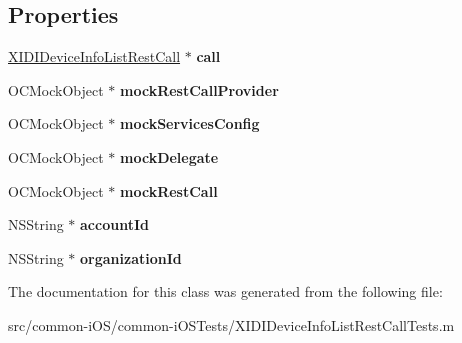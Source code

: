 \subsection*{Properties}
\begin{DoxyCompactItemize}
\item 
\hypertarget{interface_x_i_d_i_device_info_list_rest_call_tests_a65da98e4e776555e3537ef40987752d7}{}\label{interface_x_i_d_i_device_info_list_rest_call_tests_a65da98e4e776555e3537ef40987752d7} 
\hyperlink{interface_x_i_d_i_device_info_list_rest_call}{X\+I\+D\+I\+Device\+Info\+List\+Rest\+Call} $\ast$ {\bfseries call}
\item 
\hypertarget{interface_x_i_d_i_device_info_list_rest_call_tests_aac1fa51a02d67b953418c69668ecedd9}{}\label{interface_x_i_d_i_device_info_list_rest_call_tests_aac1fa51a02d67b953418c69668ecedd9} 
O\+C\+Mock\+Object $\ast$ {\bfseries mock\+Rest\+Call\+Provider}
\item 
\hypertarget{interface_x_i_d_i_device_info_list_rest_call_tests_ab87c63f846e7723bfe381d8e3baa18e5}{}\label{interface_x_i_d_i_device_info_list_rest_call_tests_ab87c63f846e7723bfe381d8e3baa18e5} 
O\+C\+Mock\+Object $\ast$ {\bfseries mock\+Services\+Config}
\item 
\hypertarget{interface_x_i_d_i_device_info_list_rest_call_tests_a8feacf9b57db974e4cc7c09fe9dc0804}{}\label{interface_x_i_d_i_device_info_list_rest_call_tests_a8feacf9b57db974e4cc7c09fe9dc0804} 
O\+C\+Mock\+Object $\ast$ {\bfseries mock\+Delegate}
\item 
\hypertarget{interface_x_i_d_i_device_info_list_rest_call_tests_a12026d0029ecd8f513db1891dc78fd14}{}\label{interface_x_i_d_i_device_info_list_rest_call_tests_a12026d0029ecd8f513db1891dc78fd14} 
O\+C\+Mock\+Object $\ast$ {\bfseries mock\+Rest\+Call}
\item 
\hypertarget{interface_x_i_d_i_device_info_list_rest_call_tests_a0ee6dff09e92d80b6f5b31addc49351f}{}\label{interface_x_i_d_i_device_info_list_rest_call_tests_a0ee6dff09e92d80b6f5b31addc49351f} 
N\+S\+String $\ast$ {\bfseries account\+Id}
\item 
\hypertarget{interface_x_i_d_i_device_info_list_rest_call_tests_a3a1d46d39a0c92397b57227612d2626b}{}\label{interface_x_i_d_i_device_info_list_rest_call_tests_a3a1d46d39a0c92397b57227612d2626b} 
N\+S\+String $\ast$ {\bfseries organization\+Id}
\end{DoxyCompactItemize}


The documentation for this class was generated from the following file\+:\begin{DoxyCompactItemize}
\item 
src/common-\/i\+O\+S/common-\/i\+O\+S\+Tests/X\+I\+D\+I\+Device\+Info\+List\+Rest\+Call\+Tests.\+m\end{DoxyCompactItemize}
